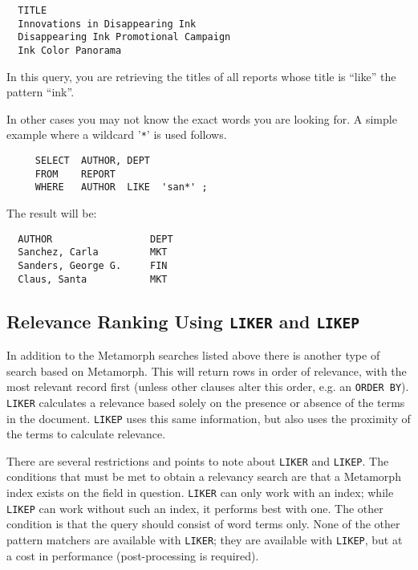 \begin{screen}
\begin{verbatim}
  TITLE
  Innovations in Disappearing Ink
  Disappearing Ink Promotional Campaign
  Ink Color Panorama
\end{verbatim}
\end{screen}

In this query, you are retrieving the titles of all reports whose
title is ``like'' the pattern ``ink''.

In other cases you may not know the exact words you are looking for.
A simple example where a wildcard '\verb`*`' is used follows.

\begin{verbatim}
     SELECT  AUTHOR, DEPT
     FROM    REPORT
     WHERE   AUTHOR  LIKE  'san*' ;
\end{verbatim}
The result will be:
\begin{screen}
\begin{verbatim}
  AUTHOR                 DEPT
  Sanchez, Carla         MKT
  Sanders, George G.     FIN
  Claus, Santa           MKT
\end{verbatim}
\end{screen}

\subsection{Relevance Ranking Using {\tt LIKER} and {\tt LIKEP}}

In addition to the Metamorph searches listed above there is another
 type of search based on Metamorph.  This will return rows in order of
 relevance, with the most relevant record first (unless other clauses
 alter this order, e.g. an \verb`ORDER BY`).  \verb`LIKER` calculates
 a relevance based solely on the presence or absence of the terms in
 the document.  \verb`LIKEP` uses this same information, but also uses
 the proximity of the terms to calculate relevance.

There are several restrictions and points to note about \verb`LIKER`
 and \verb`LIKEP`.  The conditions that must be met to obtain a
 relevancy search are that a Metamorph index exists on the field in
 question.  \verb`LIKER` can only work with an index; while
 \verb`LIKEP` can work without such an index, it performs best with
 one.  The other condition is that the query should consist of word
 terms only.  None of the other pattern matchers are available with
 \verb`LIKER`; they are available with \verb`LIKEP`, but at a cost
 in performance (post-processing is required).

